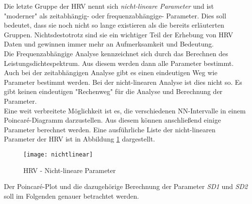  Die letzte Gruppe der HRV nennt sich \textit{nicht-lineare Parameter} und ist "moderner" als zeitabhängig- oder frequenzabhängige- Parameter. Dies soll bedeutet, dass sie noch nicht so lange existieren als die bereits erläuterten Gruppen. Nichtsdestotrotz sind sie ein wichtiger Teil der Erhebung von HRV Daten und gewinnen immer mehr an Aufmerksamkeit und Bedeutung.\\
 \color{red} 
 Die Frequenzabhängige Analyse kennzeichnet sich durch das Berechnen des Leistungsdichtespektrum. Aus diesem werden dann alle Parameter bestimmt. Auch bei der zeitabhängigen Analyse gibt es einen eindeutigen Weg wie Parameter bestimmt werden. Bei der nicht-linearen Analyse ist dies nicht so. Es gibt keinen eindeutigen "Rechenweg" für die Analyse und Berechnung der Parameter. \\ \color{black} 
 Eine  weit verbreitete Möglichkeit ist es, die verschiedenen NN-Intervalle in einem Poincaré-Diagramm darzustellen. Aus diesem können anschließend einige Parameter berechnet werden. Eine ausführliche Liste der nicht-linearen Parameter der HRV ist in Abbildung  \ref{fig:nichtlinear} dargestellt.
  \begin{figure}[H]
 	\centering
 	\texttt{[image: nichtlinear]}
 	\caption{HRV - Nicht-lineare Parameter}
 	\label{fig:nichtlinear}
 \end{figure}
 
 Der Poincaré-Plot und die dazugehörige Berechnung der Parameter \textit{SD1} und \textit{SD2} soll im Folgenden genauer betrachtet werden.
 
